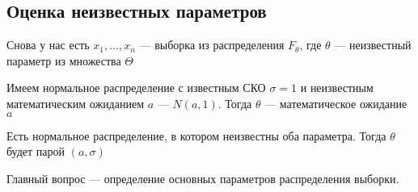 \subsection{Оценка неизвестных параметров}
Снова у нас есть $x_1, \dots, x_n$ --- выборка из распределения $F_\theta$,
где $\theta$ --- неизвестный параметр из множества $\Theta$

\begin{example}Имеем нормальное распределение с известным СКО $\sigma=1$
    и неизвестным математическим ожиданием $a$ --- $N\left(a,1\right)$.
    Тогда $\theta$ --- математическое ожидание $a$
\end{example}
\begin{example}
    Есть нормальное распределение, в котором неизвестны оба параметра.
    Тогда $\theta$ будет парой $(a,\sigma)$
\end{example}

Главный вопрос --- определение основных параметров распределения выборки.

